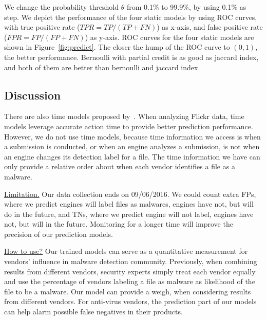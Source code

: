 

We change the probability threshold $\theta$ from 0.1\% to 99.9\%, 
by using 0.1\% as step. 
We depict the performance of the four static models by using ROC curves, 
with true positive rate ($TPR = TP/(TP+FN)$) as x-axis, 
and false positive rate ($FPR = FP/(FP + FN)$) as y-axis. 
ROC curves for the four static models are shown in Figure~\ref{fig:predict}. 
The closer the hump of the ROC curve to $(0,1)$, the better performance.
Bernoulli with partial credit is as good as jaccard index, 
and both of them are better than bernoulli and jaccard index. 


\subsection{Discussion}

There are also time models proposed by~\citet{Influence}.
When analyzing Flickr data, time models leverage accurate action time to provide better prediction performance. 
However, we do not use time models, 
because time information we access is when a submission is conducted, 
or when an engine analyzes a submission, 
is not when an engine changes its detection label for a file.
The time information we have can only provide a relative order about when each vendor identifies a file as a malware.  

\underline{Limitation.}
Our data collection ends on 09/06/2016. 
We could count extra FPs, where we predict engines will label files as malwares, engines have not, but will do in the future, 
and TNs, where we predict engine will not label, engines have not, but will in the future. 
Monitoring \vt for a longer time will improve the precision of our prediction models. 

\underline{How to use?}
Our trained models can serve as 
a quantitative measurement for vendors’ influence in malware detection community. 
Previously, when combining results from different vendors, 
security experts simply treat each vendor equally and use the percentage of 
vendors labeling a file as malware as likelihood of the file to be a malware. 
Our model can provide a weigh, when considering results from different vendors.  
For anti-virus vendors, the prediction part of our models can help alarm possible false negatives in their products.
